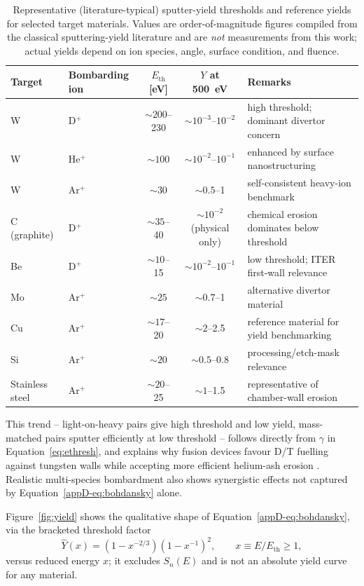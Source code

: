 \begin{table}[htbp]
\centering
\caption{Representative (literature-typical) sputter-yield thresholds and reference yields for selected target materials. Values are order-of-magnitude figures compiled from the classical sputtering-yield literature and are \emph{not} measurements from this work; actual yields depend on ion species, angle, surface condition, and fluence.}
\label{tab:sputter}
\begin{tabular}{@{}llccl@{}}
\toprule
Target & Bombarding ion & $E_{\mathrm{th}}$ [\si{\eV}] & $Y$ at \SI{500}{\eV} & Remarks \\
\midrule
W & D$^{+}$ & $\sim 200$--230 & $\sim 10^{-3}$--$10^{-2}$ & high threshold; dominant divertor concern \cite{ref0158} \\
W & He$^{+}$ & $\sim 100$ & $\sim 10^{-2}$--$10^{-1}$ & enhanced by surface nanostructuring \\
W & Ar$^{+}$ & $\sim 30$ & $\sim 0.5$--1 & self-consistent heavy-ion benchmark \\
C (graphite) & D$^{+}$ & $\sim 35$--40 & $\sim 10^{-2}$ (physical only) & chemical erosion dominates below threshold \\
Be & D$^{+}$ & $\sim 10$--15 & $\sim 10^{-2}$--$10^{-1}$ & low threshold; ITER first-wall relevance \\
Mo & Ar$^{+}$ & $\sim 25$ & $\sim 0.7$--1 & alternative divertor material \\
Cu & Ar$^{+}$ & $\sim 17$--20 & $\sim 2$--2.5 & reference material for yield benchmarking \\
Si & Ar$^{+}$ & $\sim 20$ & $\sim 0.5$--0.8 & processing/etch-mask relevance \\
Stainless steel & Ar$^{+}$ & $\sim 20$--25 & $\sim 1$--1.5 & representative of chamber-wall erosion \\
\bottomrule
\end{tabular}
\end{table}

This trend -- light-on-heavy pairs give high threshold and low yield, mass-matched pairs sputter efficiently at low threshold -- follows directly from $\gamma$ in Equation~\eqref{eq:ethresh}, and explains why fusion devices favour D/T fuelling against tungsten walls while accepting more efficient helium-ash erosion \cite{ref0143}. Realistic multi-species bombardment also shows synergistic effects not captured by Equation~\eqref{appD-eq:bohdansky} alone.

Figure~\ref{fig:yield} shows the qualitative shape of Equation~\eqref{appD-eq:bohdansky}, via the bracketed threshold factor
\begin{equation}
\hat{Y}(x) = \left(1-x^{-2/3}\right)\left(1-x^{-1}\right)^{2}, \qquad x \equiv E/E_{\mathrm{th}} \geq 1,
\label{eq:yieldnorm}
\end{equation}
versus reduced energy $x$; it excludes $S_n(E)$ and is not an absolute yield curve for any material.

